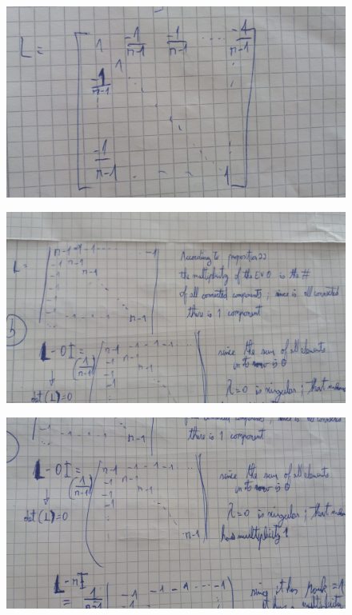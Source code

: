 \documentclass[14pt]{article}
\begin{document}
\begin{description}
\begin{figure}[h]
\end{figure}
\begin{figure}[h]
  \includegraphics[scale=0.35, angle=90]{a10-ex1-b3.jpeg}
\end{figure}
\begin{figure}[h]
  \includegraphics[scale=0.35, angle=90]{a10-ex1-b4.jpeg}
\end{figure}
\begin{figure}[h]
  \includegraphics[scale=0.35, angle=90]{a10-ex1-b5.jpeg}

\end{figure}
\end{description}
\end{document}
